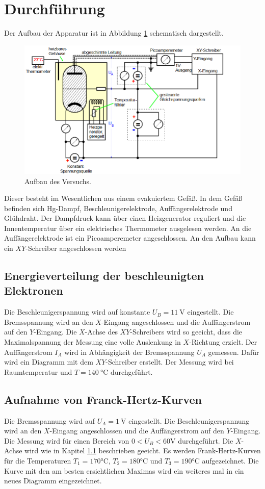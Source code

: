 \section{Durchführung}
\label{sec:Durchführung}
Der Aufbau der Apparatur ist in Abbildung \ref{fig:aufbau} schematisch dargestellt.
\begin{figure}[H]
  \centering
  \includegraphics[width=\textwidth]{content/Aufbau.png}
  \caption{Aufbau des Versuchs\cite{v601}.}
  \label{fig:aufbau}
\end{figure}
\noindent Dieser besteht im Wesentlichen aus einem evakuiertem Gefäß.
In dem Gefäß befinden sich Hg-Dampf, Beschleunigerelektrode, Auffängerelektrode und Glühdraht.
Der Dampfdruck kann über einen Heizgenerator reguliert und die Innentemperatur über ein elektrisches Thermometer ausgelesen werden.
An die Auffängerelektrode ist ein Picoamperemeter angeschlossen.
An den Aufbau kann ein $XY$-Schreiber angeschlossen werden
\subsection{Energieverteilung der beschleunigten Elektronen}
\label{sec:ene}
Die Beschleunigerspannung wird auf konstante $U_B=\SI{+11}{\volt}$ eingestellt.
Die Bremsspannung wird an den $X$-Eingang angeschlossen und die Auffängerstrom auf den $Y$-Eingang.
Die $X$-Achse des $XY$-Schreibers wird so geeicht, dass die Maximalspannung der Messung eine volle Auslenkung in $X$-Richtung erzielt.
Der Auffängerstrom $I_A$ wird in Abhängigkeit der Bremsspannung $U_A$ gemessen.
Dafür wird ein Diagramm mit dem $XY$-Schreiber erstellt.
Der Messung wird bei Raumtemperatur und $T=\SI{140}{\degreeCelsius}$ %
durchgeführt.
\subsection{Aufnahme von Franck-Hertz-Kurven}
Die Bremsspannung wird auf $U_A = \SI{1}{\volt}$ eingestellt.
Die Beschleunigerspannung wird an den $X$-Eingang angeschlossen und die Auffängerstrom auf den $Y$-Eingang.
Die Messung wird für einen Bereich von $0 < U_B < 60\si{\volt}$ durchgeführt.
Die $X$-Achse wird wie in Kapitel \ref{sec:ene} beschrieben geeicht.
Es werden Frank-Hertz-Kurven für die Temperaturen $T_1= 170\si{\degreeCelsius}$, $T_2= 180\si{\degreeCelsius}$ und $T_3= 190\si{\degreeCelsius}$ aufgezeichnet.
Die Kurve mit den am besten ersichtlichen Maximas wird ein weiteres mal in ein neues Diagramm eingezeichnet.

